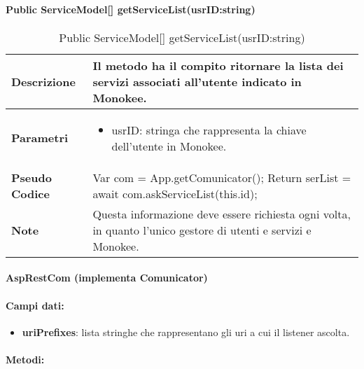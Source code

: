 \paragraph{Public ServiceModel[] getServiceList(usrID:string)}
\begin{center}
    \begin{longtable}{|p{3cm}|p{9cm}|}%
    \caption{Public ServiceModel[] getServiceList(usrID:string)}
    \label{tab:public-ServiceModel[]-getServiceList}
    \endfirsthead
    \endhead
    \hline
    \textbf{Descrizione} & Il metodo ha il compito ritornare la lista dei servizi associati all’utente indicato in Monokee.  \\
    \hline
    \textbf{Parametri} &      
        \begin{itemize}
            \item usrID: stringa che rappresenta la chiave dell’utente in Monokee.
        \end{itemize}
    \\
    \hline
    \textbf{Pseudo Codice} & 
            Var com = App.getComunicator();\newline
            Return serList = await com.askServiceList(this.id);
    \\
    \hline
    \textbf{Note} & Questa informazione deve essere richiesta ogni volta, in quanto l’unico gestore di utenti e servizi e Monokee. \\
    \hline
    \end{longtable}
    \end{center}

\paragraph{AspRestCom (implementa Comunicator)}
\paragraph{Campi dati:}
\begin{itemize}
    \item \textbf{uriPrefixes}: lista stringhe che rappresentano gli uri a cui il listener ascolta. 
\end{itemize}

\paragraph{Metodi:}
